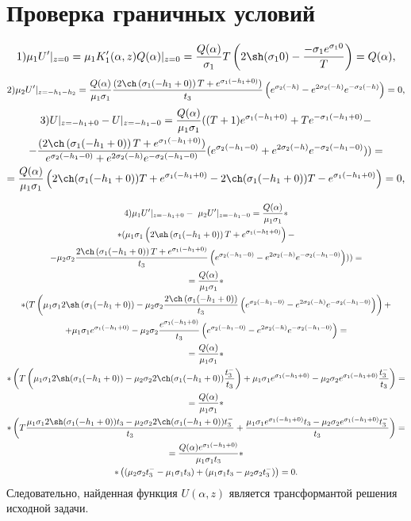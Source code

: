 \documentclass[a4paper, 12pt]{article}
\newcommand{\s}[1]{\sigma_{#1}}
\newcommand{\m}[1]{\mu_{#1}}
\newcommand{\E}[2]{e^{#1 #2}}
\begin{document}
\section{Проверка граничных условий}
$$1) \m{1}U'|_{z=0}=\m{1}K_1'(\alpha,z)Q(\alpha)|_{z=0}=\frac{Q(\alpha)}{\s{1}}T \left(2 \sh (\s{1}0) -\frac{-\s{1}\E{\s{1}}{0}}{T}\right)=Q(\alpha),$$
$$2)\m{2}U'|_{z=-h_1-h_2}=\frac{Q(\alpha)}{\m{1} \s{1}}\frac{(2\ch \left(\s{1}(-h_1+0) \right)T+\E{\s{1}}{(-h_1+0)})}{t_3}\left(\E{\s{2}}{(-h)}- \E{2\s{2}}{(-h)} \E{-\s{2}}{(-h)} \right)=0,$$
\begin{multline}
    3)U|_{z=-h_1+0}-U|_{z=-h_1-0}=\frac{Q(\alpha)}{\m{1} \s{1}} ((T+1)\E{\s{1}}{(-h_1+0)}+T\E{-\s{1}}{(-h_1+0)}-\\
    -\frac{(2\ch \left (\s{1}(-h_1+0) \right)T+\E{\s{1}}{(-h_1+0)})}{\E{\s{2}}{(-h_1-0)}+ \E{2\s{2}}{(-h)} \E{-\s{2}}{(-h_1-0)}}(\E{\s{2}}{(-h_1-0)}+ \E{2\s{2}}{(-h)} \E{-\s{2}}{(-h_1-0)}) )=\\
    =\frac{Q(\alpha)}{\m{1} \s{1}} \left(2 \ch (\s{1}(-h_1+0))T +\E{\s{1}}{(-h_1+0)} - 2 \ch (\s{1}(-h_1+0))T-\E{\s{1}}{(-h_1+0)}\right)=0,
\end{multline}

\begin{multline}
    4)\mu_1  U'|_{z=-h_1+0}-\ \mu_2  U'|_{z=-h_1-0}=\frac{Q(\alpha)}{\m{1} \s{1}}*\\
    *( \m{1}\s{1}\left( 2\sh \left(\s{1}(-h_1+0) \right)T+\E{\s{1}}{(-h_1+0)}\right)-\\
    -\m{2}\s{2} \frac{2\ch \left(\s{1}(-h_1+0) \right)T+\E{\s{1}}{(-h_1+0)}}{t_3}\left(\E{\s{2}}{(-h_1-0)}- \E{2\s{2}}{(-h)} \E{-\s{2}}{(-h_1-0)}  \right)))=\\
    =\frac{Q(\alpha)}{\m{1} \s{1}}*\\
    *( T\left(  \m{1}\s{1} 2\sh \left(\s{1}(-h_1+0)\right)-\m{2}\s{2} \frac{2\ch \left(\s{1}(-h_1+0) \right)}{t_3}\left(\E{\s{2}}{(-h_1-0)}- \E{2\s{2}}{(-h)} \E{-\s{2}}{(-h_1-0)}  \right)\right)+\\
    +\m{1}\s{1}\E{\s{1}}{(-h_1+0)}-\m{2}\s{2}\frac{\E{\s{1}}{(-h_1+0)}}{t_3}\left(\E{\s{2}}{(-h_1-0)}- \E{2\s{2}}{(-h)} \E{-\s{2}}{(-h_1-0)}  \right)=\\
    =\frac{Q(\alpha)}{\m{1} \s{1}}*\\
    *\left(T\left( \m{1}\s{1}2\sh (\s{1}(-h_1+0)) -\m{2}\s{2} 2\ch (\s{1}(-h_1+0))\frac{t_3^-}{t_3} \right) +\m{1}\s{1}\E{\s{1}}{(-h_1+0)}-\m{2}\s{2}\E{\s{1}}{(-h_1+0)} \frac{t_3^-}{t_3}\right)=\\
    =\frac{Q(\alpha)}{\m{1} \s{1}}*\\
    *\left(T\frac{\m{1}\s{1}2\sh(\s{1}(-h_1+0))t_3-\m{2}\s{2}2\ch(\s{1}(-h_1+0))t_3^-}{t_3} +  \frac{\m{1}\s{1}\E{\s{1}}{(-h_1+0)}t_3-\m{2}\s{2}\E{\s{1}}{(-h_1+0)}t_3^-}{t_3} \right)=\\
    =\frac{Q(\alpha)\E{\s{1}}{(-h_1+0)}}{\m{1} \s{1}t_3}*\\
    *\left((\m{2}\s{2}t_3^--\m{1}\s{1}t_3)+(\m{1}\s{1}t_3-\m{2}\s{2}t_3^-) \right)=0.
\end{multline}
Следовательно, найденная функция $U(\alpha,z)$ является трансформантой решения исходной задачи.
\end{document}
